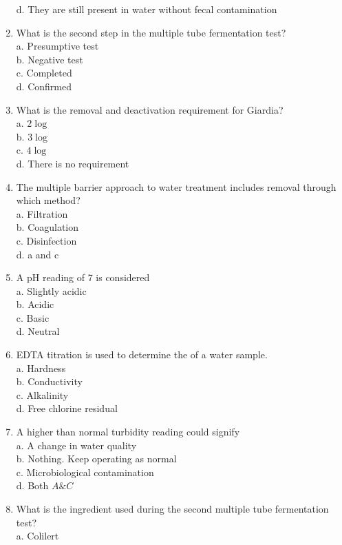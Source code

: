 \begin{enumerate}[1.]
d. They are still present in water without fecal contamination\\
\item What is the second step in the multiple tube fermentation test?\\
a. Presumptive test\\
b. Negative test\\
c. Completed\\
d. Confirmed\\
\item What is the removal and deactivation requirement for Giardia?\\
a. $2 \log$\\
b. $3 \log$\\
c. $4 \log$\\
d. There is no requirement\\
\item The multiple barrier approach to water treatment includes removal through which method?\\
a. Filtration\\
b. Coagulation\\
c. Disinfection\\
d. a and c\\
\item A pH reading of 7 is considered\\
a. Slightly acidic\\
b. Acidic\\
c. Basic\\
d. Neutral\\
\item EDTA titration is used to determine the of a water sample.\\
a. Hardness\\
b. Conductivity\\
c. Alkalinity\\
d. Free chlorine residual\\
\item A higher than normal turbidity reading could signify\\
a. A change in water quality\\
b. Nothing. Keep operating as normal\\
c. Microbiological contamination\\
d. Both $A \& C$\\
\item What is the ingredient used during the second multiple tube fermentation test?\\
a. Colilert\\

\end{enumerate}
